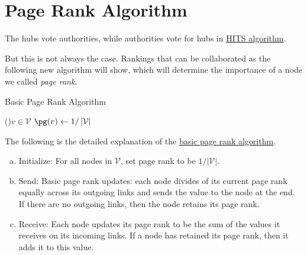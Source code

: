 \section{Page Rank Algorithm}
\begin{prev}
	The hubs vote authorities, while authorities vote for hubs in \hyperref[algo:HITS-algorithm]{HITS algorithm}.
\end{prev}

But this is not always the case. Rankings that can be collaborated as the following new algorithm will show, which will determine the importance of a node we called \emph{page rank}.

\begin{algorithm}[H]\label{algo:basic-page-rank-algorithm}
	\DontPrintSemicolon
	\caption{Basic Page Rank Algorithm}
	\KwResult{\pg}

	\BlankLine

	\For(){\(v\in \mathcal{V}\)}{
		\(\pg(v) \gets 1 / \left\vert \mathcal{V} \right\vert \)\;
	}
	\;
	\;
	\Return{\pg}\;
\end{algorithm}

\begin{remark}
	The following is the detailed explanation of the \hyperref[algo:basic-page-rank-algorithm]{basic page rank algorithm}.
	\begin{enumerate}[(a)]
		\item\label{algo:basic-page-rank-algorithm:initialize} Initialize: For all nodes in \(\mathcal{V}\), set page rank to be \(1 / \left\vert \mathcal{V}  \right\vert\).
		\item\label{algo:basic-page-rank-algorithm:send} Send: Basic page rank updates: each node divides of its current page rank equally across its outgoing links and sends the value to the node at the end. If there are no outgoing links, then the node retains its page rank.
		\item \label{algo:basic-page-rank-algorithm:receive} Receive: Each node updates its page rank to be the sum of the values it receives on its incoming links. If a node has retained its page rank, then it adds it to this value.
	\end{enumerate}
\end{remark}

